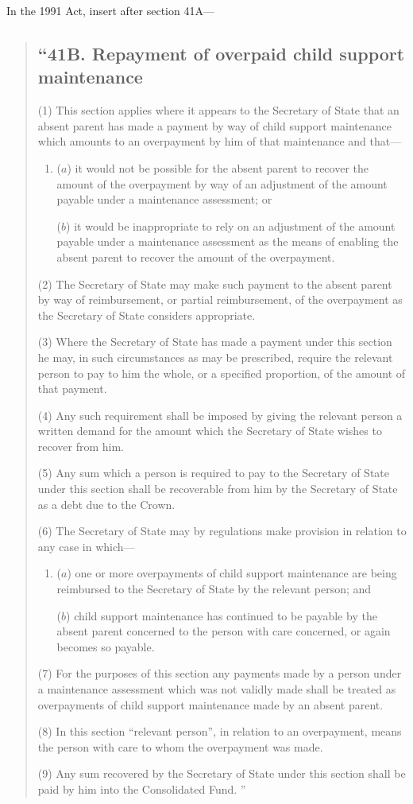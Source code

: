 \documentclass[a4paper]{article}
\begin{document}
In the 1991 Act, insert after section 41A—
\begin{quotation}
\subsection*{\sloppy “41B. Repayment of overpaid child support maintenance}

(1) This section applies where it appears to the Secretary of State that an absent parent has made a payment by way of child support maintenance which amounts to an overpayment by him of that maintenance and that—
\begin{enumerate}\item[]
($a$) it would not be possible for the absent parent to recover the amount of the overpayment by way of an adjustment of the amount payable under a maintenance assessment; or

($b$) it would be inappropriate to rely on an adjustment of the amount payable under a maintenance assessment as the means of enabling the absent parent to recover the amount of the overpayment.
\end{enumerate}

(2) The Secretary of State may make such payment to the absent parent by way of reimbursement, or partial reimbursement, of the overpayment as the Secretary of State considers appropriate.

(3) Where the Secretary of State has made a payment under this section he may, in such circumstances as may be prescribed, require the relevant person to pay to him the whole, or a specified proportion, of the amount of that payment.

(4) Any such requirement shall be imposed by giving the relevant person a written demand for the amount which the Secretary of State wishes to recover from him.

(5) Any sum which a person is required to pay to the Secretary of State under this section shall be recoverable from him by the Secretary of State as a debt due to the Crown.

(6) The Secretary of State may by regulations make provision in relation to any case in which—
\begin{enumerate}\item[]
($a$) one or more overpayments of child support maintenance are being reimbursed to the Secretary of State by the relevant person; and

($b$) child support maintenance has continued to be payable by the absent parent concerned to the person with care concerned, or again becomes so payable.
\end{enumerate}

(7) For the purposes of this section any payments made by a person under a maintenance assessment which was not validly made shall be treated as overpayments of child support maintenance made by an absent parent.%

(8) In this section “relevant person”, in relation to an overpayment, means the person with care to whom the overpayment was made.

(9) Any sum recovered by the Secretary of State under this section shall be paid by him into the Consolidated Fund.%
”
\end{quotation}
\end{document}
